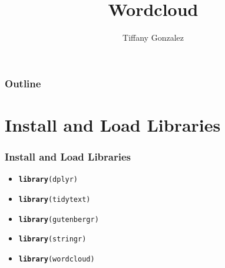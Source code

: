 \documentclass{beamer}\usepackage[]{graphicx}\usepackage[]{color}
\makeatletter
\newcommand{\hlstd}[1]{\textcolor[rgb]{0.345,0.345,0.345}{#1}}%
\newcommand{\hlkwd}[1]{\textcolor[rgb]{0.737,0.353,0.396}{\textbf{#1}}}%
\newenvironment{kframe}{%
 \def\at@end@of@kframe{}%
 \ifinner\ifhmode%
  \def\at@end@of@kframe{\end{minipage}}%
  \begin{minipage}{\columnwidth}%
 \fi\fi%
 \def\FrameCommand##1{\hskip\@totalleftmargin \hskip-\fboxsep
 \colorbox{shadecolor}{##1}\hskip-\fboxsep
     \hskip-\linewidth \hskip-\@totalleftmargin \hskip\columnwidth}%
 \MakeFramed {\advance\hsize-\width
   \@totalleftmargin\z@ \linewidth\hsize
   \@setminipage}}%
 {\par\unskip\endMakeFramed%
 \at@end@of@kframe}
\newenvironment{knitrout}{}{} %
\makeatother
\begin{document}
\title{Wordcloud}
\author{Tiffany Gonzalez}

\begin{frame}
  \titlepage
\end{frame}

\begin{frame}
  \frametitle{Outline}
    \tableofcontents
\end{frame}

\section{Install and Load Libraries}
\begin{frame}[fragile]
  \frametitle{Install and Load Libraries}
    \begin{itemize}
      \item<1->
\begin{knitrout}
\color{fgcolor}\begin{kframe}
\begin{alltt}
\hlkwd{library}\hlstd{(dplyr)}
\end{alltt}
\end{kframe}
\end{knitrout}
      \item<2->
\begin{knitrout}
\color{fgcolor}\begin{kframe}
\begin{alltt}
\hlkwd{library}\hlstd{(tidytext)}
\end{alltt}
\end{kframe}
\end{knitrout}
      \item<3->
\begin{knitrout}
\color{fgcolor}\begin{kframe}
\begin{alltt}
\hlkwd{library}\hlstd{(gutenbergr)}
\end{alltt}
\end{kframe}
\end{knitrout}
      \item<4->
\begin{knitrout}
\color{fgcolor}\begin{kframe}
\begin{alltt}
\hlkwd{library}\hlstd{(stringr)}
\end{alltt}
\end{kframe}
\end{knitrout}
      \item<5->
\begin{knitrout}
\color{fgcolor}\begin{kframe}
\begin{alltt}
\hlkwd{library}\hlstd{(wordcloud)}
\end{alltt}
\end{kframe}
\end{knitrout}
    \end{itemize}
\end{frame}  
\end{document}
